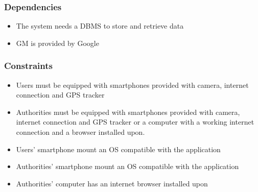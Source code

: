 \subsubsection{Dependencies}

\begin{itemize}
    \item The system needs a DBMS to store and retrieve data
    \item GM is provided by Google
\end{itemize}

\subsubsection{Constraints}

\begin{itemize}
    \item Users must be equipped with smartphones provided with camera, 
    internet connection and GPS tracker
    \item Authorities must be equipped with smartphones provided with 
    camera, internet connection and GPS tracker or a computer with a 
    working internet connection and a browser installed upon.
    \item Users' smartphone mount an OS compatible with the application
    \item Authorities' smartphone mount an OS compatible with the application
    \item Authorities' computer has an internet browser installed upon
\end{itemize}